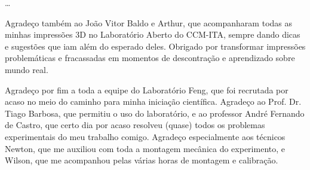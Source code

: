 \dots

Agradeço também ao João Vitor Baldo e Arthur, que acompanharam todas as minhas impressões 3D no Laboratório Aberto do CCM-ITA, sempre dando dicas e sugestões que iam além do esperado deles. Obrigado por transformar impressões problemáticas e fracassadas em momentos de descontração e aprendizado sobre mundo real.

Agradeço por fim a toda a equipe do Laboratório Feng, que foi recrutada por acaso no meio do caminho para minha iniciação científica. Agradeço ao Prof. Dr. Tiago Barbosa, que permitiu o uso do laboratório, e ao professor André Fernando de Castro, que certo dia por acaso resolveu (quase) todos os problemas experimentais do meu trabalho comigo. Agradeço especialmente aos técnicos Newton, que me auxiliou com toda a montagem mecânica do experimento, e Wilson, que me acompanhou pelas várias horas de montagem e calibração.
